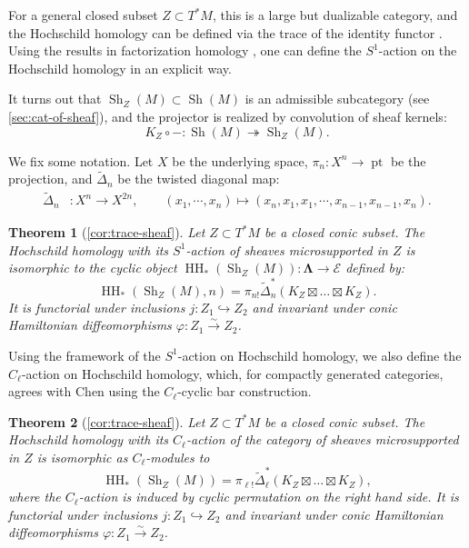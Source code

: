\documentclass[11pt]{amsart}
\numberwithin{equation}{section}
\theoremstyle{plain}
\newtheorem{Thm}{Theorem}[section]
\theoremstyle{definition}
\theoremstyle{remark}
\newcommand{\cE} { {\mathcal{E}}}
\newcommand{\pt}{{\operatorname{pt}}}
\newcommand{\Sh} { {\operatorname{Sh}}}
\newcommand\HH{\operatorname{HH}}
\begin{document}
For a general closed subset $Z \subset T^*M$, this is a large but dualizable category, and the Hochschild homology can be defined via the trace of the identity functor \cite{Hoyois-Scherotzke-Sibilla}. Using the results in factorization homology \cite{Ayala-Francis-FH-dim1}, one can define the $S^1$-action on the Hochschild homology in an explicit way. 

It turns out that $\Sh_Z(M) \subset \Sh(M)$ is an admissible subcategory (see \autoref{sec:cat-of-sheaf}), and the projector is realized by convolution of sheaf kernels:
\[K_Z\circ -: \Sh(M) \twoheadrightarrow \Sh_Z(M).\]

We fix some notation. Let $X$ be the underlying space, $\pi_{n} : X^n  \rightarrow \pt$ be the projection, and $\widetilde{\Delta}_n$ be the twisted diagonal map:
\begin{align*}
    \widetilde{\Delta}_n&: X^n \rightarrow X^{2n}, \qquad (x_1,\cdots,x_n)\mapsto (x_n,x_1,x_1,\cdots,x_{n-1},x_{n-1},x_n).
\end{align*}


\begin{Thm}[\autoref{cor:trace-sheaf}]
    Let $Z \subset T^*M$ be a closed conic subset. The Hochschild homology with its $S^1$-action of sheaves microsupported in $Z$ is isomorphic to the cyclic object $\HH_*(\Sh_Z(M)): \boldsymbol{\Lambda} \to \cE$ defined by:
    \[\HH_*(\Sh_Z(M), n) = \pi_{n!}\widetilde{\Delta}_{n}^*(K_Z \boxtimes \dots \boxtimes K_Z).\]
    It is functorial under inclusions $j: Z_1 \hookrightarrow Z_2$ and invariant under conic Hamiltonian diffeomorphisms $\varphi: Z_1 \xrightarrow{\sim} Z_2$.
\end{Thm}

Using the framework of the $S^1$-action on Hochschild homology, we also define the $C_\ell$-action on Hochschild homology, which, for compactly generated categories, agrees with Chen \cite{Chen1} using the $C_\ell$-cyclic bar construction.

\begin{Thm}[\autoref{cor:trace-sheaf}]
    Let $Z \subset T^*M$ be a closed conic subset. The Hochschild homology with its $C_\ell$-action of the category of sheaves microsupported in $Z$ is isomorphic as $C_\ell$-modules to
    \[\HH_*(\Sh_Z(M)) = \pi_{\ell!}\widetilde{\Delta}_{\ell}^*(K_Z \boxtimes \dots \boxtimes K_Z),\]
    where the $C_\ell$-action is induced by cyclic permutation on the right hand side.
    It is functorial under inclusions $j: Z_1 \hookrightarrow Z_2$ and invariant under conic Hamiltonian diffeomorphisms $\varphi: Z_1 \xrightarrow{\sim} Z_2$.
\end{Thm}
\end{document}
